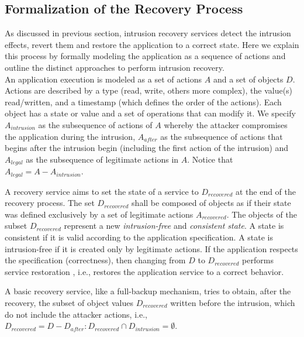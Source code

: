 \subsection{Formalization of the Recovery Process}
\label{subSec:RecoveryModels}
As discussed in previous section, intrusion recovery services detect the intrusion effects, revert them and restore the application to a correct state. Here we explain this process by formally modeling the application as a sequence of actions and outline the distinct approaches to perform intrusion recovery. \\ 

An application execution is modeled as a set of actions $A$ and a set of objects $D$. Actions are described by a type (read, write, others more complex), the value(s) read/written, and a timestamp (which defines the order of the actions). Each object has a state or value and a set of operations that can modify it. We specify $A_{intrusion}$ as the subsequence of actions of $A$ whereby the attacker compromises the application during the intrusion, $A_{after}$ as the subsequence of actions that begins after the intrusion begin (including the first action of the intrusion) and $A_{legal}$ as the subsequence of legitimate actions in $A$. Notice that $A_{legal} = A - A_{intrusion}$. 

A recovery service aims to set the state of a service to $D_{recovered}$ at the end of the recovery process. The set $D_{recovered}$ shall be composed of objects as if their state was defined exclusively by a set of legitimate actions $A_{recovered}$. The objects of the subset $D_{recovered}$ represent a new \textit{intrusion-free} and \textit{consistent state}. A state is consistent if it is valid according to the application specification. A state is intrusion-free if it is created only by legitimate actions. If the application respects the specification (correctness), then changing from $D$ to $D_{recovered}$ performs service restoration \cite{Aviz}, i.e., restores the application service to a correct behavior.

A basic recovery service, like a full-backup mechanism, tries to obtain, after the recovery, the subset of object values $D_{recovered}$ written before the intrusion, which do not include the attacker actions, i.e., $D_{recovered} = D - D_{after} : D_{recovered} \cap D_{intrusion} = \emptyset$.

